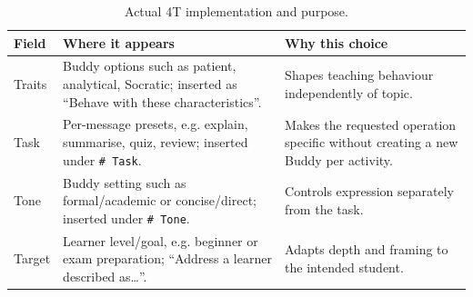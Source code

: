 \begin{table}[htbp]
\centering\small
\caption{Actual 4T implementation and purpose.}
\label{tab:4ts}
\begin{tabularx}{\linewidth}{@{}p{15mm}YY@{}}
\toprule
\textbf{Field} & \textbf{Where it appears} & \textbf{Why this choice}\\
\midrule
Traits & Buddy options such as patient, analytical, Socratic; inserted as ``Behave with these characteristics''. & Shapes teaching behaviour independently of topic.\\
Task & Per-message presets, e.g. explain, summarise, quiz, review; inserted under \texttt{\# Task}. & Makes the requested operation specific without creating a new Buddy per activity.\\
Tone & Buddy setting such as formal/academic or concise/direct; inserted under \texttt{\# Tone}. & Controls expression separately from the task.\\
Target & Learner level/goal, e.g. beginner or exam preparation; ``Address a learner described as\ldots''. & Adapts depth and framing to the intended student.\\
\bottomrule
\end{tabularx}
\end{table}
